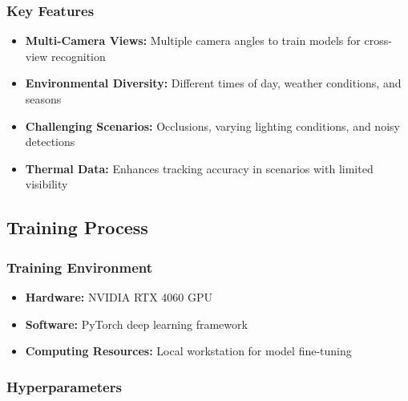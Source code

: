 \subsubsection{Key Features}
\label{subsubsection:dataset-key-features}

\begin{itemize}
    \item \textbf{Multi-Camera Views:} Multiple camera angles to train models for cross-view recognition
    \item \textbf{Environmental Diversity:} Different times of day, weather conditions, and seasons
    \item \textbf{Challenging Scenarios:} Occlusions, varying lighting conditions, and noisy detections
    \item \textbf{Thermal Data:} Enhances tracking accuracy in scenarios with limited visibility
\end{itemize}

\subsection{Training Process}
\label{subsection:training-process}

\subsubsection{Training Environment}
\label{subsubsection:training-environment}

\begin{itemize}
    \item \textbf{Hardware:} NVIDIA RTX 4060 GPU
    \item \textbf{Software:} PyTorch deep learning framework
    \item \textbf{Computing Resources:} Local workstation for model fine-tuning
\end{itemize}

\subsubsection{Hyperparameters}
\label{subsubsection:hyperparameters}

